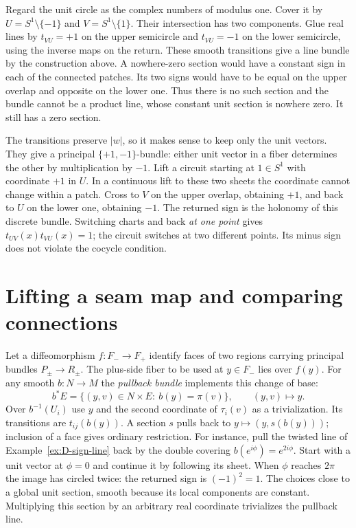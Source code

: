 \begin{example}\label{ex:D-sign-line}
Regard the unit circle as the complex numbers of modulus one. Cover it by $U=S^1\setminus\{-1\}$ and $V=S^1\setminus\{1\}$. Their intersection has two components. Glue real lines by $t_{VU}=+1$ on the upper semicircle and $t_{VU}=-1$ on the lower semicircle, using the inverse maps on the return. These smooth transitions give a line bundle by the construction above. A nowhere-zero section would have a constant sign in each of the connected patches. Its two signs would have to be equal on the upper overlap and opposite on the lower one. Thus there is no such section and the bundle cannot be a product line, whose constant unit section is nowhere zero. It still has a zero section.

The transitions preserve $|w|$, so it makes sense to keep only the unit vectors. They give a principal $\{+1,-1\}$-bundle: either unit vector in a fiber determines the other by multiplication by $-1$. Lift a circuit starting at $1\in S^1$ with coordinate $+1$ in $U$. In a continuous lift to these two sheets the coordinate cannot change within a patch. Cross to $V$ on the upper overlap, obtaining $+1$, and back to $U$ on the lower one, obtaining $-1$. The returned sign is the holonomy of this discrete bundle. Switching charts and back \emph{at one point} gives $t_{UV}(x)t_{VU}(x)=1$; the circuit switches at two different points. Its minus sign does not violate the cocycle condition.
\end{example}

\section{Lifting a seam map and comparing connections}\label{sec:D-bundle-lift}

Let a diffeomorphism $f:F_-\to F_+$ identify faces of two regions carrying principal bundles $P_\pm\to R_\pm$. The plus-side fiber to be used at $y\in F_-$ lies over $f(y)$. For any smooth $b:N\to M$ the \emph{pullback bundle} implements this change of base:
\[
 b^*E=\{(y,v)\in N\times E:\ b(y)=\pi(v)\},\qquad (y,v)\longmapsto y .
\]
Over $b^{-1}(U_i)$ use $y$ and the second coordinate of $\tau_i(v)$ as a trivialization. Its transitions are $t_{ij}(b(y))$. A section $s$ pulls back to $y\mapsto(y,s(b(y)))$; inclusion of a face gives ordinary restriction. For instance, pull the twisted line of Example~\ref{ex:D-sign-line} back by the double covering $b(e^{i\phi})=e^{2i\phi}$. Start with a unit vector at $\phi=0$ and continue it by following its sheet. When $\phi$ reaches $2\pi$ the image has circled twice: the returned sign is $(-1)^2=1$. The choices close to a global unit section, smooth because its local components are constant. Multiplying this section by an arbitrary real coordinate trivializes the pullback line.

